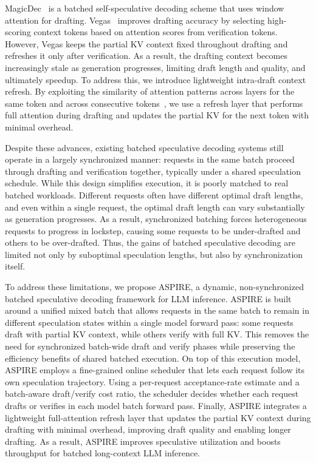 MagicDec~\citep{sadhukhan2025magicdec} is a batched self-speculative decoding scheme that uses window attention for drafting. Vegas~\citep{yue2026vegas} improves drafting accuracy by selecting high-scoring context tokens based on attention scores from verification tokens. However, Vegas keeps the partial KV context fixed throughout drafting and refreshes it only after verification. As a result, the drafting context becomes increasingly stale as generation progresses, limiting draft length and quality, and ultimately speedup. To address this, we introduce lightweight intra-draft context refresh. By exploiting the similarity of attention patterns across layers for the same token and across consecutive tokens~\citep{zarch-etal-2026-delta, yang2025tidaldecode}, we use a refresh layer that performs full attention during drafting and updates the partial KV for the next token with minimal overhead.

Despite these advances, existing batched speculative decoding systems still operate in a largely synchronized manner: requests in the same batch proceed through drafting and verification together, typically under a shared speculation schedule. While this design simplifies execution, it is poorly matched to real batched workloads. Different requests often have different optimal draft lengths, and even within a single request, the optimal draft length can vary substantially as generation progresses. As a result, synchronized batching forces heterogeneous requests to progress in lockstep, causing some requests to be under-drafted and others to be over-drafted. Thus, the gains of batched speculative decoding are limited not only by suboptimal speculation lengths, but also by synchronization itself.

To address these limitations, we propose ASPIRE, a dynamic, non-synchronized batched speculative decoding framework for LLM inference. ASPIRE is built around a unified mixed batch that allows requests in the same batch to remain in different speculation states within a single model forward pass: some requests draft with partial KV context, while others verify with full KV. This removes the need for synchronized batch-wide draft and verify phases while preserving the efficiency benefits of shared batched execution. On top of this execution model, ASPIRE employs a fine-grained online scheduler that lets each request follow its own speculation trajectory. Using a per-request acceptance-rate estimate and a batch-aware draft/verify cost ratio, the scheduler decides whether each request drafts or verifies in each model batch forward pass. Finally, ASPIRE integrates a lightweight full-attention refresh layer that updates the partial KV context during drafting with minimal overhead, improving draft quality and enabling longer drafting. As a result, ASPIRE improves speculative utilization and boosts throughput for batched long-context LLM inference.

